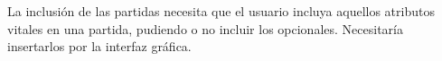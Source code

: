 La inclusión de las partidas necesita que el usuario incluya aquellos atributos vitales en una partida, pudiendo o no incluir los opcionales. Necesitaría insertarlos por la interfaz gráfica.
